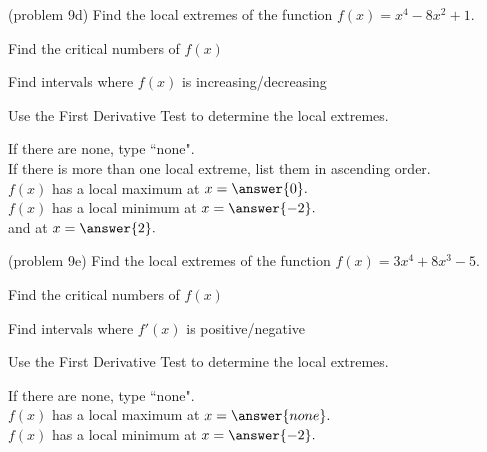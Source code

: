 \documentclass[handout]{ximera}
\begin{document}
\begin{problem}(problem 9d)
Find the local extremes of the function $f(x) = x^4 - 8x^2 + 1.$
\begin{hint}
Find the critical numbers of $f(x)$
\end{hint}
\begin{hint}
Find intervals where $f(x)$ is increasing/decreasing
\end{hint}
\begin{hint}
Use the First Derivative Test to determine the local extremes.
\end{hint}

If there are none, type ``none".\\
If there is more than one local extreme, list them in ascending order.\\
$f(x)$ has a local maximum at $x = \answer{0}.$\\
$f(x)$ has a local minimum at $x = \answer{-2}.$\\
and at $x = \answer{2}.$
\end{problem}


\begin{problem}(problem 9e)
Find the local extremes of the function $f(x) = 3x^4 +8x^3 - 5.$\\
\begin{hint}
Find the critical numbers of $f(x)$
\end{hint}
\begin{hint}
Find intervals where $f'(x)$ is positive/negative
\end{hint}
\begin{hint}
Use the First Derivative Test to determine the local extremes.
\end{hint}

If there are none, type ``none".\\
$f(x)$ has a local maximum at $x = \answer{none}.$\\
$f(x)$ has a local minimum at $x = \answer{-2}.$
\end{problem}
\end{document}
